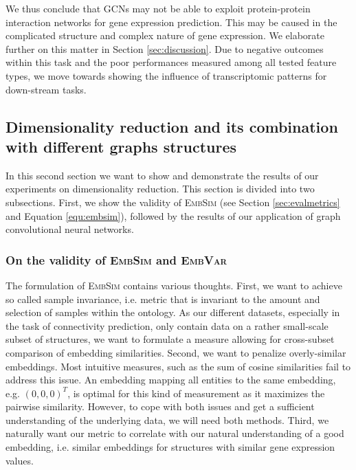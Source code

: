\documentclass[]{article}
\begin{document}
We thus conclude that GCNs may not be able to exploit protein-protein interaction networks for gene expression prediction. This may be caused in the complicated structure and complex nature of gene expression. We elaborate further on this matter in Section \ref{sec:discussion}. Due to negative outcomes within this task and the poor performances measured among all tested feature types, we move towards showing the influence of transcriptomic patterns for down-stream tasks. 


\subsection{Dimensionality reduction and its combination with different graphs structures}
\label{sec:results_dimred}

In this second section we want to show and demonstrate the results of our experiments on dimensionality reduction. This section is divided into two subsections. First, we show the validity of \textsc{EmbSim} (see Section \ref{sec:evalmetrics} and Equation \ref{equ:embsim}), followed by the results of our application of graph convolutional neural networks.

\subsubsection{On the validity of \textsc{EmbSim} and \textsc{EmbVar}}
\label{sec:results_embsim}

The formulation of \textsc{EmbSim} contains various thoughts. First, we want to achieve so called sample invariance, i.e. metric that is invariant to the amount and selection of samples within the ontology. As our different datasets, especially in the task of connectivity prediction, only contain data on a rather small-scale subset of structures, we want to formulate a measure allowing for cross-subset comparison of embedding similarities. 
Second, we want to penalize overly-similar embeddings. Most intuitive measures, such as the sum of cosine similarities fail to address this issue. An embedding mapping all entities to the same embedding, e.g. $(0,0,0)^T$, is optimal for this kind of measurement as it maximizes the pairwise similarity. However, to cope with both issues and get a sufficient understanding of the underlying data, we will need both methods. Third, we naturally want our metric to correlate with our natural understanding of a good embedding, i.e. similar embeddings for structures with similar gene expression values.\\
\end{document}

